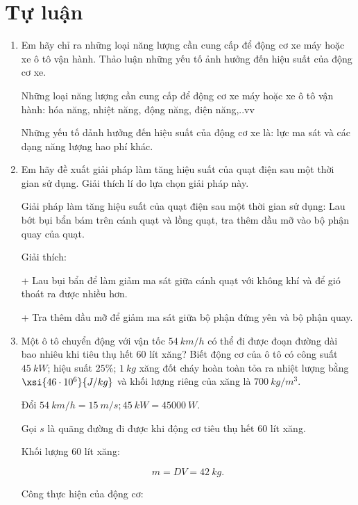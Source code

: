 \section{Tự luận}
\begin{enumerate}[label=\bfseries Câu \arabic*:, leftmargin=1.5cm]
	\item {}
	
	
	{
		Em hãy chỉ ra những loại năng lượng cần cung cấp để động cơ xe máy hoặc xe ô tô vận hành. Thảo luận những yếu tố ảnh hưởng đến hiệu suất của động cơ xe.
	}
	
	\hideall
	{	
		Những loại năng lượng cần cung cấp để động cơ xe máy hoặc xe ô tô vận hành: hóa năng, nhiệt năng, động năng, điện năng,..vv 
		
		Những yếu tố dảnh hưởng đến hiệu suất của động cơ xe là: lực ma sát và các dạng năng lượng hao phí khác.
	}
	\item {}
	
	
	{
		Em hãy đề xuất giải pháp làm tăng hiệu suất của quạt điện sau một thời gian sử dụng. Giải thích lí do lựa chọn giải pháp này.
	}
	
	\hideall
	{	
		Giải pháp làm tăng hiệu suất của quạt điện sau một thời gian sử dụng: Lau bớt bụi bẩn bám trên cánh quạt và lồng quạt, tra thêm dầu mỡ vào bộ phận quay của quạt.
		
		Giải thích:
		
		+ Lau bụi bẩn để làm giảm ma sát giữa cánh quạt với không khí và để gió thoát ra được nhiều hơn.
		
		+ Tra thêm dầu mỡ để giảm ma sát giữa bộ phận đứng yên và bộ phận quay. 
	}

	
	\item {}
	
	
	{
		Một ô tô chuyển động với vận tốc $\SI{54}{km/h}$ có thể đi được đoạn đường dài bao nhiêu khi tiêu thụ hết 60 lít xăng? Biết động cơ của ô tô có công suất $\SI{45}{kW}$; hiệu suất $25\%$; $\SI{1}{kg}$ xăng đốt cháy hoàn toàn tỏa ra nhiệt lượng bằng $\xsi{46\cdot 10^6}{J/kg}$ và khối lượng riêng của xăng là $\SI{700}{kg/m^3}$.
	}
	
	\hideall
	{	
		Đổi $\SI{54}{km/h} = \SI{15}{m/s}; \SI{45}{kW} = \SI{45000}{W}.$
		
		Gọi $s$ là quãng đường đi được khi động cơ tiêu thụ hết 60 lít xăng.
		
		Khối lượng 60 lít xăng:
		
		$$m = DV = \SI{42}{kg}.$$
		
		Công thực hiện của động cơ:
		
}
\end{enumerate}
